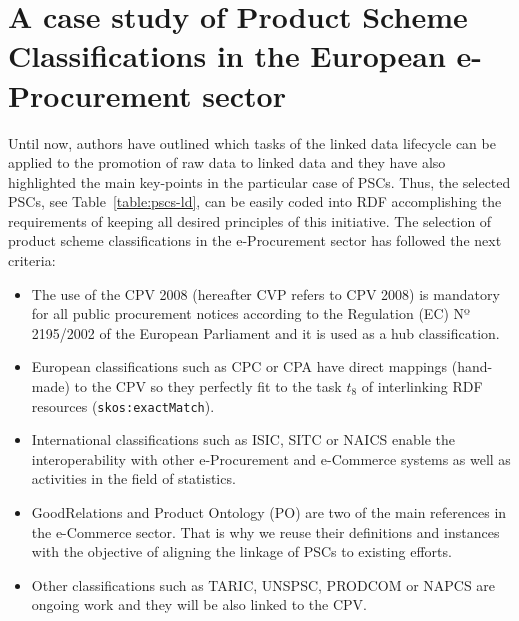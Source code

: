 \documentclass[preprint,12pt]{elsarticle}
\begin{document}
\section{A case study of Product Scheme Classifications in the European e-Procurement sector}\label{sect:use-case}
Until now, authors have outlined which tasks of the linked data lifecycle can be applied to the promotion of raw data to 
linked data and they have also highlighted the main key-points in the particular case of PSCs. Thus, the selected PSCs, see Table~\ref{table:pscs-ld}, 
can be easily coded into RDF accomplishing the requirements of keeping all desired principles of this initiative. 
The selection of product scheme classifications in the e-Procurement sector has followed the next criteria: 
\begin{itemize}
 \item The use of the CPV 2008 (hereafter CVP refers to CPV 2008) is mandatory for all public procurement notices according 
 to the Regulation (EC) Nº 2195/2002 of the European Parliament and it is used as a hub classification.
 \item European classifications such as CPC or CPA have direct mappings (hand-made) to the CPV so they perfectly fit 
 to the task $t_8$ of interlinking RDF resources (\texttt{skos:exactMatch}).
 \item International classifications such as ISIC, SITC or NAICS enable the interoperability with 
 other e-Procurement and e-Commerce systems as well as activities in the field of statistics.
 \item GoodRelations and Product Ontology (PO) are two of the main references in the e-Commerce sector. 
 That is why we reuse their definitions and instances with the objective of aligning the linkage of PSCs to existing efforts. 
 \item Other classifications such as TARIC, UNSPSC, PRODCOM or NAPCS are ongoing work and they will be also linked to the CPV.
\end{itemize}
\end{document}
